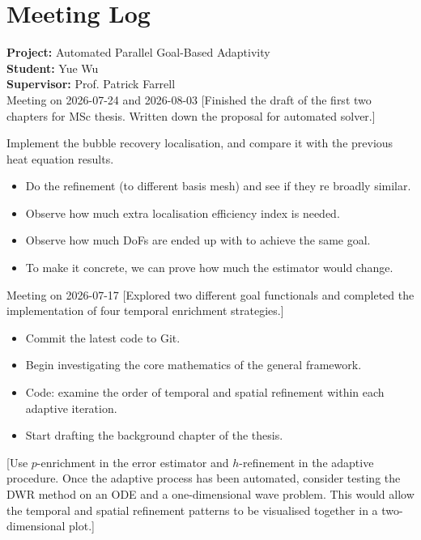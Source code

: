 \documentclass[11pt,a4paper]{article}
\begin{document}
\section*{Meeting Log}


\textbf{Project:} Automated Parallel Goal-Based Adaptivity\\
\textbf{Student:} Yue Wu\\
\textbf{Supervisor:} Prof. Patrick Farrell\\



\meet
{Meeting on 2026-07-24 and 2026-08-03}
[Finished the draft of the first two chapters for MSc thesis. Written down the proposal for automated solver.]
{Implement the bubble recovery localisation, and compare it with the previous heat equation results.
\begin{itemize}
\item Do the refinement (to different basis mesh) and see if they re broadly similar.
\item Observe how much extra localisation efficiency index is needed.
\item Observe how much DoFs are ended up with to achieve the same goal.
\item To make it concrete, we can prove how much the estimator would change.
\end{itemize}}
\vspace{1.5em}



\meet
{Meeting on 2026-07-17}
[Explored two different goal functionals and completed the implementation of four temporal enrichment strategies.]
{\begin{itemize}
\item Commit the latest code to Git.
\item Begin investigating the core mathematics of the general framework.
\item Code: examine the order of temporal and spatial refinement within each adaptive iteration.
\item Start drafting the background chapter of the thesis.
\end{itemize}}
[Use $p$-enrichment in the error estimator and $h$-refinement in the adaptive procedure. Once the adaptive process has been automated, consider testing the DWR method on an ODE and a one-dimensional wave problem. This would allow the temporal and spatial refinement patterns to be visualised together in a two-dimensional plot.]
\vspace{1.5em}
\end{document}
